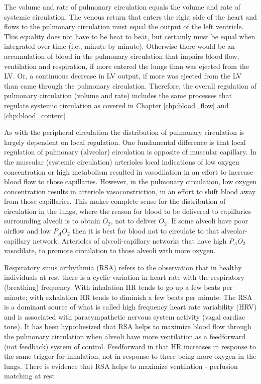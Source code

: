 The volume and rate of pulmonary circulation equals the volume and rate of systemic circulation. The venous return that enters the right side of the heart and flows to the pulmonary circulation must equal the output of the left ventricle. This equality does not have to be beat to beat, but certainly must be equal when integrated over time (i.e., minute by minute). Otherwise there would be an accumulation of blood in the pulmonary circulation that impairs blood flow, ventilation and respiration, if more entered the lungs than was ejected from the LV. Or, a continuous decrease in LV output, if more was ejected from the LV than came through the pulmonary circulation. Therefore, the overall regulation of pulmonary circulation (volume and rate) includes the same processes that regulate systemic circulation as covered in Chapter \ref{chp:blood_flow} and \ref{chp:blood_content}

As with the peripheral circulation the distribution of pulmonary circulation is largely dependent on local regulation. One fundamental difference is that local regulation of pulmonary (alveolar) circulation is opposite of muscular capillary. In the muscular (systemic circulation) arterioles local indications of low oxygen concentration or high metabolism resulted in vasodilation in an effort to increase blood flow to those capillaries. However, in the pulmonary circulation, low oxygen concentration results in arteriole vasoconstriction, in an effort to shift blood away from those capillaries. This makes complete sense for the distribution of circulation in the lungs, where the reason for blood to be delivered to capillaries surrounding alveoli is to obtain $O_2$, not to deliver $O_2$. If some alveoli have poor airflow and low $P_AO_2$ then it is best for blood not to circulate to that alveolar-capillary network. Arterioles of alveoli-capillary networks that have high $P_AO_2$ vasodilate, to promote circulation to those alveoli with more oxygen.

Respiratory sinus arrhythmia (RSA) refers to the observation that in healthy individuals at rest there is a cyclic variation in heart rate with the respiratory (breathing) frequency. With inhalation HR tends to go up a few beats per minute; with exhalation HR tends to diminish a few beats per minute. The RSA is a dominant source of what is called high frequency heart rate variability (HRV) and is associated with parasympathetic nervous system activity (vagal cardiac tone). It has been hypothesized that RSA helps to maximize blood flow through the pulmonary circulation when alveoli have more ventilation as a feedforward (not feedback) system of control. Feedforward in that HR increases in response to the same trigger for inhalation, not in response to there being more oxygen in the lungs. There is evidence that RSA helps to maximize ventilation - perfusion matching at rest \cite{hayano_hypothesis_2003}.

